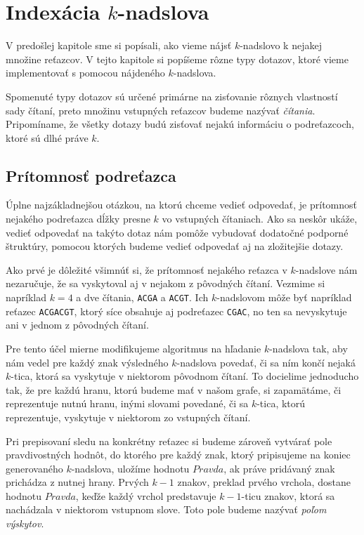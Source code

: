 \chapter{Indexácia $k$-nadslova}

V predošlej kapitole sme si popísali, ako vieme nájsť $k$-nadslovo k nejakej
množine reťazcov. V tejto kapitole si popíšeme rôzne typy dotazov, ktoré
vieme implementovať s pomocou nájdeného $k$-nadslova.

Spomenuté typy dotazov sú určené primárne na zisťovanie
rôznych vlastností sady čítaní, preto množinu vstupných reťazcov budeme 
nazývať \emph{čítania}. Pripomíname, že všetky dotazy budú zisťovať nejakú
informáciu o podreťazcoch, ktoré sú dlhé práve $k$.

\section{Prítomnosť podreťazca}

Úplne najzákladnejšou otázkou, na ktorú chceme vedieť odpovedať, je prítomnosť
nejakého podreťazca dĺžky presne $k$ vo vstupných čítaniach. Ako sa neskôr ukáže,
vedieť odpovedať na takýto dotaz nám pomôže vybudovať dodatočné podporné
štruktúry, pomocou ktorých budeme vedieť odpovedať aj na zložitejšie dotazy.

Ako prvé je dôležité všimnúť si, že prítomnosť nejakého reťazca v $k$-nadslove
nám nezaručuje, že sa vyskytoval aj v nejakom z pôvodných čítaní. Vezmime si
napríklad $k = 4$ a dve čítania, \texttt{ACGA} a \texttt{ACGT}. Ich $k$-nadslovom
môže byť napríklad reťazec \texttt{ACGACGT}, ktorý síce obsahuje aj
podreťazec \texttt{CGAC}, no ten sa nevyskytuje ani v jednom z pôvodných čítaní.

Pre tento účel mierne modifikujeme algoritmus na hľadanie $k$-nadslova tak, aby nám
vedel pre každý znak výsledného $k$-nadslova povedať, či sa ním končí nejaká $k$-tica,
ktorá sa vyskytuje v niektorom pôvodnom čítaní. To docielime jednoducho tak, že
pre každú hranu, ktorú budeme mať v našom grafe, si zapamätáme, či reprezentuje
nutnú hranu, inými slovami povedané, či sa $k$-tica, ktorú reprezentuje, vyskytuje
v niektorom zo vstupných čítaní.

Pri prepisovaní sledu na konkrétny reťazec si budeme zároveň vytvárať pole
pravdivostných hodnôt, do ktorého pre každý znak, ktorý pripisujeme na koniec
generovaného $k$-nadslova, uložíme hodnotu $Pravda$, ak práve pridávaný znak
prichádza z nutnej hrany. Prvých $k-1$ znakov, preklad prvého vrchola, dostane
hodnotu $Pravda$, keďže každý vrchol predstavuje $k-1$-ticu znakov, ktorá sa
nachádzala v niektorom vstupnom slove. Toto pole budeme nazývať \emph{poľom výskytov}.


